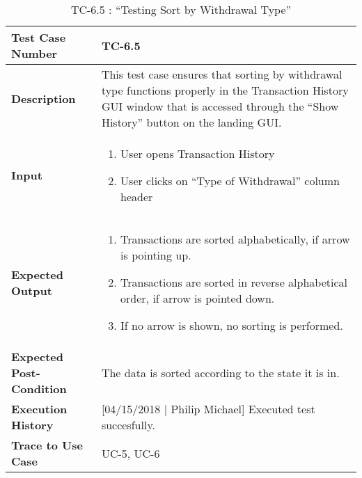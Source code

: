 \documentclass[12pt]{article}
\begin{document}
\begin{table}[H]
\caption{TC-6.5 : “Testing Sort by Withdrawal Type”}
\begin{center}
\begin{tabular}{|p{5.5	cm}|p{11cm}|}
  \hline
  \bf Test Case Number & TC-6.5\\\hline
  \bf Description & This test case ensures that sorting by withdrawal type functions properly in the Transaction History GUI window that is accessed through the ``Show History'' button on the landing GUI.\\\hline
  \bf Input &
  \begin{enumerate}
  \item User opens Transaction History
  \item User clicks on ``Type of Withdrawal'' column header
  \end{enumerate}
  \\\hline
  \bf Expected Output &
  \begin{enumerate}
  \item Transactions are sorted alphabetically, if arrow is pointing up.
  \item Transactions are sorted in reverse alphabetical order, if arrow is pointed down.
  \item If no arrow is shown, no sorting is performed.
  \end{enumerate}
  \\\hline
  \bf Expected Post-Condition & The data is sorted according to the state it is in.\\\hline
  \bf Execution History & [04/15/2018 | Philip Michael] Executed test succesfully.\\\hline
  \bf Trace to Use Case & UC-5, UC-6\\

  \hline
\end{tabular}
\end{center}
\end{table}
\end{document}
